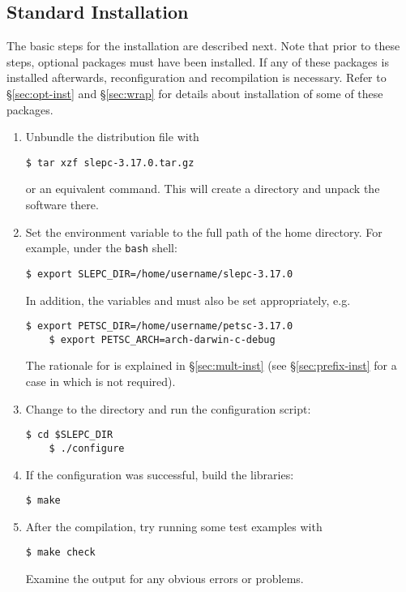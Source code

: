 \subsection{Standard Installation}
\label{sec:std-inst}

	The basic steps for the installation are described next. Note that prior to these steps, optional packages must have been installed. If any of these packages is installed afterwards, reconfiguration and recompilation is necessary. Refer to \S\ref{sec:opt-inst} and \S\ref{sec:wrap} for details about installation of some of these packages.

\begin{enumerate}
	\item Unbundle the distribution file with
	\begin{Verbatim}[fontsize=\small]
	$ tar xzf slepc-3.17.0.tar.gz
	\end{Verbatim}
        or an equivalent command. This will create a directory and unpack the software there.
	\item Set the environment variable  to the full path of the \slepc home directory. For example, under the \texttt{bash} shell:
	\begin{Verbatim}[fontsize=\small]
	$ export SLEPC_DIR=/home/username/slepc-3.17.0
	\end{Verbatim}
	In addition, the variables  and  must also be set appropriately, e.g.
	\begin{Verbatim}[fontsize=\small]
	$ export PETSC_DIR=/home/username/petsc-3.17.0
	$ export PETSC_ARCH=arch-darwin-c-debug
	\end{Verbatim}
        The rationale for  is explained in \S\ref{sec:mult-inst} (see \S\ref{sec:prefix-inst} for a case in which  is not required).
	\item\label{step-config} Change to the \slepc directory and run the configuration script:
	\begin{Verbatim}[fontsize=\small]
	$ cd $SLEPC_DIR
	$ ./configure
	\end{Verbatim}
	\item If the configuration was successful, build the libraries:
	\begin{Verbatim}[fontsize=\small]
	$ make
	\end{Verbatim}
	\item After the compilation, try running some test examples with
	\begin{Verbatim}[fontsize=\small]
	$ make check
	\end{Verbatim}
        Examine the output for any obvious errors or problems.
\end{enumerate}
	
